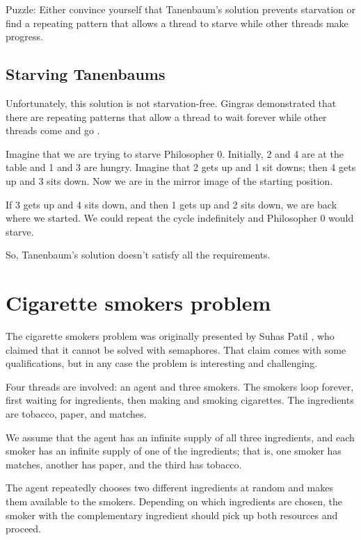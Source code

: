 \documentclass{book}
\begin{document}
Puzzle: Either convince yourself that Tanenbaum's solution prevents
starvation or find a repeating pattern that allows a thread to starve
while other threads make progress.



\subsection{Starving Tanenbaums}

Unfortunately, this solution is not starvation-free.  Gingras
demonstrated that there are repeating patterns that allow a
thread to wait forever while other threads come and go
\cite{gingras90dining}.

Imagine that we are trying to starve Philosopher 0.  Initially,
2 and 4 are at the table and 1 and 3 are hungry.  Imagine that 2 gets up and
1 sit downs; then 4 gets up and 3 sits down.
Now we are in the mirror image of the starting position.

If 3 gets up and 4 sits
down, and then 1 gets up and 2 sits down, we are back
where we started.  We could repeat the cycle indefinitely and
Philosopher 0 would starve.

So, Tanenbaum's solution doesn't satisfy all the requirements.





\section {Cigarette smokers problem}

The cigarette smokers problem was originally presented by
Suhas Patil \cite{patil}, who claimed that it cannot be solved with
semaphores.  That claim comes with some qualifications, but in
any case the problem is interesting and challenging.

Four threads are involved: an agent and three smokers.  The smokers
loop forever, first waiting for ingredients, then making and smoking
cigarettes.  The ingredients are tobacco, paper, and matches.

We assume that the agent has an infinite supply of all three
ingredients, and each smoker has an infinite supply of one of
the ingredients; that is, one smoker has matches, another has
paper, and the third has tobacco.

The agent repeatedly chooses two different ingredients at random
and makes them available to the smokers.  Depending on which
ingredients are chosen, the smoker with the complementary ingredient
should pick up both resources and proceed.
\end{document}
